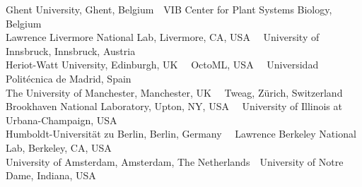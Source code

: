 \documentclass[conference]{IEEEtran}
\begin{document}
{{    Ghent University, Ghent, Belgium\ \
    VIB Center for Plant Systems Biology, Belgium \\
    \IEEEauthorrefmark{11}Lawrence Livermore National Lab, Livermore, CA, USA \ \
    University of Innsbruck, Innsbruck, Austria \\
    \IEEEauthorrefmark{13}Heriot-Watt University, Edinburgh, UK \ \
    OctoML, USA \ \
    Universidad Polit\'{e}cnica de Madrid, Spain \\
    \IEEEauthorrefmark{16}The University of Manchester, Manchester, UK \ \
    Tweag, Z\"{u}rich, Switzerland \\
    \IEEEauthorrefmark{18}Brookhaven National Laboratory, Upton, NY, USA \ \
    University of Illinois at Urbana-Champaign, USA \\
    \IEEEauthorrefmark{20}Humboldt-Universität zu Berlin, Berlin, Germany \ \
    Lawrence Berkeley National Lab, Berkeley, CA, USA \\
    \IEEEauthorrefmark{22}University of Amsterdam, Amsterdam, The Netherlands\ \
    University of Notre Dame, Indiana, USA \\
  }
}

\maketitle














\end{document}
